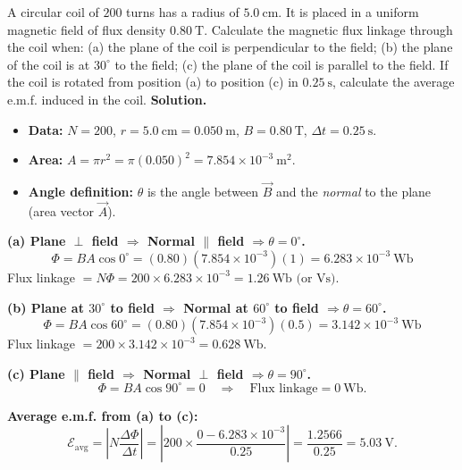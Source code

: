 \documentclass[11pt]{article}
\begin{document}
\begin{exoresolu}
A circular coil of $200$ turns has a radius of $5.0\ \mathrm{cm}$. It is placed in a uniform magnetic field of flux density $0.80\ \mathrm{T}$. Calculate the magnetic flux linkage through the coil when: (a) the plane of the coil is perpendicular to the field; (b) the plane of the coil is at $30^\circ$ to the field; (c) the plane of the coil is parallel to the field. If the coil is rotated from position (a) to position (c) in $0.25\ \mathrm{s}$, calculate the average e.m.f. induced in the coil.
\tcblower
\textbf{Solution.}
\begin{itemize}
\item \textbf{Data:} $N = 200$, $r = 5.0\ \mathrm{cm} = 0.050\ \mathrm{m}$, $B = 0.80\ \mathrm{T}$, $\Delta t = 0.25\ \mathrm{s}$.
\item \textbf{Area:} $A = \pi r^2 = \pi (0.050)^2 = 7.854 \times 10^{-3}\ \mathrm{m^2}$.
\item \textbf{Angle definition:} $\theta$ is the angle between $\vec{B}$ and the \emph{normal} to the plane (area vector $\vec{A}$).
\end{itemize}
\textbf{(a) Plane $\perp$ field $\Rightarrow$ Normal $\parallel$ field $\Rightarrow \theta = 0^\circ$.}
\[
\Phi = BA\cos 0^\circ = (0.80)(7.854\times 10^{-3})(1) = 6.283 \times 10^{-3}\ \mathrm{Wb}
\]
Flux linkage $= N\Phi = 200 \times 6.283\times 10^{-3} = \boxed{1.26\ \mathrm{Wb}\text{ (or Vs)}}$.

\textbf{(b) Plane at $30^\circ$ to field $\Rightarrow$ Normal at $60^\circ$ to field $\Rightarrow \theta = 60^\circ$.}
\[
\Phi = BA\cos 60^\circ = (0.80)(7.854\times 10^{-3})(0.5) = 3.142 \times 10^{-3}\ \mathrm{Wb}
\]
Flux linkage $= 200 \times 3.142\times 10^{-3} = \boxed{0.628\ \mathrm{Wb}}$.

\textbf{(c) Plane $\parallel$ field $\Rightarrow$ Normal $\perp$ field $\Rightarrow \theta = 90^\circ$.}
\[
\Phi = BA\cos 90^\circ = 0 \quad \Rightarrow \quad \text{Flux linkage} = \boxed{0\ \mathrm{Wb}}.
\]

\textbf{Average e.m.f. from (a) to (c):}
\[
\mathcal{E}_{\text{avg}} = \left| N \frac{\Delta \Phi}{\Delta t} \right| = \left| 200 \times \frac{0 - 6.283\times 10^{-3}}{0.25} \right| = \frac{1.2566}{0.25} = \boxed{5.03\ \mathrm{V}}.
\]
\end{exoresolu}
\end{document}
